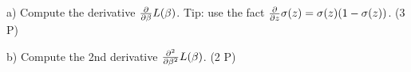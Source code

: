 a) Compute the derivative $\frac{\partial}{\partial \beta} L(\beta)$. Tip: use the fact 
$\frac{\partial}{\partial z}\sigma(z) = \sigma(z)(1-\sigma(z))$. (3 P)

b) Compute the 2nd derivative $\frac{\partial^2}{\partial \beta^2} L(\beta)$. (2 P)








\exerfoot
